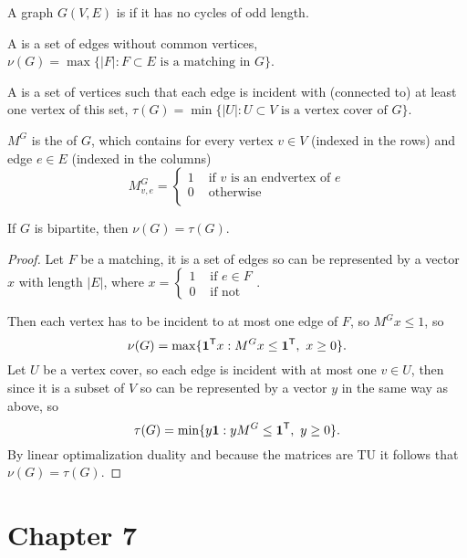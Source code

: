 \documentclass{exam}
\begin{document}
    \begin{define}
        A graph $G(V,E)$ is  if it has no cycles of odd length.

        A  is a set of edges without common vertices, $\nu (G) = \max \{ |F| : F \subset E \text{ is a matching in } G \}$.

        A  is a set of vertices such that each edge is incident with (connected to) at least one vertex of this set, $\tau (G) = \min \{ |U|: U \subset V \text{ is a vertex cover of } G \}$.

        $M^G$ is the  of $G$, which contains for every vertex $v \in V$ (indexed in the rows) and edge $e \in E$ (indexed in the columns)
        \[
            M_{v,e}^G =
            \begin{cases}
                1 & \text{ if $v$ is an endvertex of $e$} \\
                0 & \text { otherwise } \\
            \end{cases}
        \]
    \end{define}
    \begin{theorem}
        If $G$ is bipartite, then $\nu (G) = \tau (G)$.
    \end{theorem}
    \begin{proof}
        Let $F$ be a matching, it is a set of edges so can be represented by a vector $x$ with length $|E|$, where $x = \begin{cases} 1 & \text{ if } e \in F \\ 0 & \text{ if not } \end{cases}$.

        Then each vertex has to be incident to at most one edge of $F$, so $M^G x \le 1$, so
        \[
            \nu (G) = \max \{ {\textbf{1}}^{\mathsf{T}} x : M^G x \le {\textbf{1}}^{\mathsf{T}},\ x \ge 0 \}.
        \]
        Let $U$ be a vertex cover, so each edge is incident with at most one $v \in U$, then since it is a subset of $V$ so can be represented by a vector $y$ in the same way as above, so
        \[
            \tau (G) = \min \{ y {\textbf{1}} : y M^G \le {\textbf{1}}^{\mathsf{T}},\ y \ge 0 \}.
        \]
        By linear optimalization duality and because the matrices are TU it follows that $\nu (G) = \tau (G)$.
    \end{proof}

    \section{Chapter 7}
\end{document}
